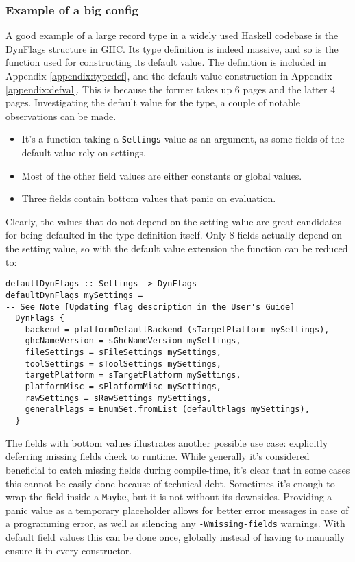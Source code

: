 \documentclass[en]{pracamgr}
\begin{document}
\subsubsection{Example of a big config}
A good example of a large record type in a widely used Haskell codebase is the DynFlags structure in GHC.
Its type definition is indeed massive, and so is the function used for constructing its default value.
The definition is included in Appendix \ref{appendix:typedef}, and the default value construction in Appendix \ref{appendix:defval}.
This is because the former takes up 6 pages and the latter 4 pages.
Investigating the default value for the type, a couple of notable observations can be made.
\begin{itemize}
  \item It's a function taking a \texttt{Settings} value as an argument, as some fields of the default value rely on settings.
  \item Most of the other field values are either constants or global values.
  \item Three fields contain bottom values that panic on evaluation.
\end{itemize}
Clearly, the values that do not depend on the setting value are great candidates for being defaulted in the type definition itself.
Only 8 fields actually depend on the setting value, so with the default value extension the function can be reduced to:
\begin{lstlisting}
defaultDynFlags :: Settings -> DynFlags
defaultDynFlags mySettings =
-- See Note [Updating flag description in the User's Guide]
  DynFlags {
    backend = platformDefaultBackend (sTargetPlatform mySettings),
    ghcNameVersion = sGhcNameVersion mySettings,
    fileSettings = sFileSettings mySettings,
    toolSettings = sToolSettings mySettings,
    targetPlatform = sTargetPlatform mySettings,
    platformMisc = sPlatformMisc mySettings,
    rawSettings = sRawSettings mySettings,
    generalFlags = EnumSet.fromList (defaultFlags mySettings),
  }
\end{lstlisting}
The fields with bottom values illustrates another possible use case: explicitly deferring missing fields check to runtime.
While generally it's considered beneficial to catch missing fields during compile-time, it's clear that in some cases this cannot be easily done
because of technical debt. Sometimes it's enough to wrap the field inside a \texttt{Maybe}, but it is not without its downsides.
Providing a panic value as a temporary placeholder allows for better error messages in case of a programming error, as well as silencing any 
\texttt{-Wmissing-fields} warnings. With default field values this can be done once, globally instead of having to manually ensure it in every constructor.
\end{document}
